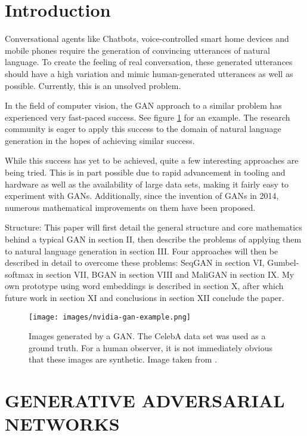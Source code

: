\documentclass[a4paper,conference]{IEEEtran}
\begin{document}
\section{Introduction}
Conversational agents like Chatbots, voice-controlled smart home devices and mobile phones require the generation of convincing utterances of natural language. To create the feeling of real conversation, these generated utterances should have a high variation and mimic human-generated utterances as well as possible. Currently, this is an unsolved problem.

In the field of computer vision, the GAN approach to a similar problem has experienced very fast-paced success. See figure \ref{img:nvidia-gan-example} for an example. The research community is eager to apply this success to the domain of natural language generation in the hopes of achieving similar success.

While this success has yet to be achieved, quite a few interesting approaches are being tried. This is in part possible due to rapid advancement in tooling and hardware as well as the availability of large data sets, making it fairly easy to experiment with GANs. Additionally, since the invention of GANs in 2014, numerous mathematical improvements on them have been proposed.

Structure: This paper will first detail the general structure and core mathematics behind a typical GAN in section II, then describe the problems of applying them to natural language generation in section III. Four approaches will then be described in detail to overcome these problems: SeqGAN in section VI, Gumbel-softmax  in section VII, BGAN in section VIII and MaliGAN in section IX. My own prototype using word embeddings is described in section X, after which future work in section XI and conclusions in section XII conclude the paper.

\begin{figure}[thpb]
      \centering
      \texttt{[image: images/nvidia-gan-example.png]}
      \caption{Images generated by a GAN. The CelebA data set was used as a ground truth. For a human observer, it is not immediately obvious that these images are synthetic. Image taken from \cite{c35}.}
      \label{img:nvidia-gan-example}
   \end{figure}


\section{GENERATIVE ADVERSARIAL NETWORKS}
\end{document}

